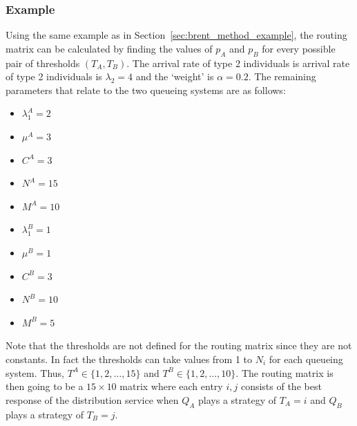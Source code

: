 \subsubsection{Example}\label{sec:routing_matrix_example}
Using the same example as in Section~\ref{sec:brent_method_example}, the routing
matrix can be calculated by finding the values of \(p_A\) and \(p_B\) for every
possible pair of thresholds \((T_A, T_B)\).
The arrival rate of type 2 individuals is arrival rate of type 2 individuals is
\(\lambda_2 = 4\) and the `weight' is \(\alpha = 0.2\).
The remaining parameters that relate to the two queueing systems are as follows:

\begin{multicols}{2}
    \begin{itemize}
        \item \(\lambda_1^A = 2\)
        \item \(\mu^A = 3\)
        \item \(C^A = 3\)
        \item \(N^A = 15\)
        \item \(M^A = 10\)
        \item \(\lambda_1^B = 1\)
        \item \(\mu^B = 1\)
        \item \(C^B = 3\)
        \item \(N^B = 10\)
        \item \(M^B = 5\)
    \end{itemize}
\end{multicols}

Note that the thresholds are not defined for the routing matrix since they are
not constants.
In fact the thresholds can take values from 1 to \(N_i\) for each queueing
system.
Thus, \(T^A \in \{1, 2, \dots, 15\}\) and \(T^B \in \{1, 2, \dots, 10\}\).
The routing matrix is then going to be a \(15 \times 10\) matrix where each
entry \(i, j\) consists of the best response of the distribution service when
\(Q_A\) plays a strategy of \(T_A=i\) and \(Q_B\) plays a strategy of \(T_B=j\).


